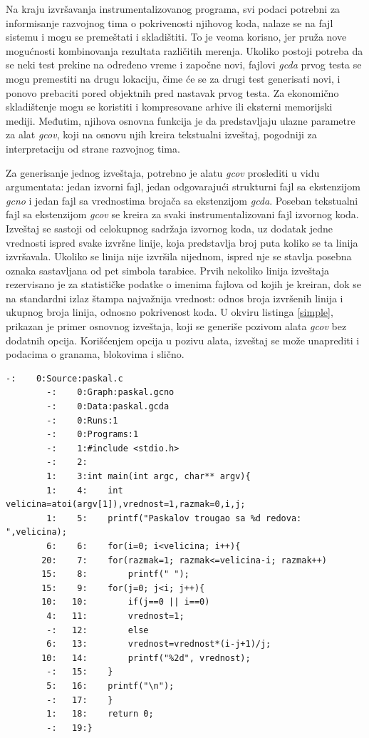 \documentclass[12pt,oneside]{memoir}
\newcommand{\strano}[1]{\textit{#1}}
\begin{document}
Na kraju izvršavanja instrumentalizovanog programa, svi podaci potrebni za informisanje razvojnog tima o pokrivenosti njihovog koda, nalaze se na fajl sistemu i mogu se premeštati i skladištiti. To je veoma korisno, jer pruža nove mogućnosti kombinovanja rezultata različitih merenja. Ukoliko postoji potreba da se neki test prekine na određeno vreme i započne novi, fajlovi \strano{gcda} prvog testa se mogu premestiti na drugu lokaciju, čime će se za drugi test generisati novi, i ponovo prebaciti pored objektnih pred nastavak prvog testa. Za ekonomično skladištenje mogu se koristiti i kompresovane arhive ili eksterni memorijski mediji. Međutim, njihova osnovna funkcija je da predstavljaju ulazne parametre za alat \strano{gcov}, koji na osnovu njih kreira tekstualni izveštaj, pogodniji za interpretaciju od strane razvojnog tima.

Za generisanje jednog izveštaja, potrebno je alatu \strano{gcov} proslediti u vidu argumentata: jedan izvorni fajl, jedan odgovarajući strukturni fajl sa ekstenzijom \strano{gcno} i jedan fajl sa vrednostima brojača sa ekstenzijom \strano{gcda}. Poseban tekstualni fajl sa ekstenzijom \strano{gcov} se kreira za svaki instrumentalizovani fajl izvornog koda. Izveštaj se sastoji od celokupnog sadržaja izvornog koda, uz dodatak jedne vrednosti ispred svake izvršne linije, koja predstavlja broj puta koliko se ta linija izvršavala. Ukoliko se linija nije izvršila nijednom, ispred nje se stavlja posebna oznaka sastavljana od pet simbola tarabice. Prvih nekoliko linija izveštaja rezervisano je za statističke podatke o imenima fajlova od kojih je kreiran, dok se na standardni izlaz štampa najvažnija vrednost: odnos broja izvršenih linija i ukupnog broja linija, odnosno pokrivenost koda. U okviru listinga \ref{simple}, prikazan je primer osnovnog izveštaja, koji se generiše pozivom alata \strano{gcov} bez dodatnih opcija. Korišćenjem opcija u pozivu alata, izveštaj se može unaprediti i podacima o granama, blokovima i slično. 
\\

\begin{lstlisting}[caption={Primer osnovnog izveštaja koji generiše \strano{gcov}},frame=single, label=simple]
        -:    0:Source:paskal.c
        -:    0:Graph:paskal.gcno
        -:    0:Data:paskal.gcda
        -:    0:Runs:1
        -:    0:Programs:1
        -:    1:#include <stdio.h>
        -:    2:
        1:    3:int main(int argc, char** argv){
        1:    4:    int velicina=atoi(argv[1]),vrednost=1,razmak=0,i,j;
        1:    5:    printf("Paskalov trougao sa %d redova: ",velicina);
        6:    6:    for(i=0; i<velicina; i++){
       20:    7:	for(razmak=1; razmak<=velicina-i; razmak++)
       15:    8:	    printf(" ");
       15:    9:	for(j=0; j<i; j++){
       10:   10:	    if(j==0 || i==0)
        4:   11:		vrednost=1;
        -:   12:	    else
        6:   13:		vrednost=vrednost*(i-j+1)/j;
       10:   14:	    printf("%2d", vrednost);
        -:   15:	}
        5:   16:	printf("\n");
        -:   17:    }
        1:   18:    return 0;
        -:   19:}
\end{lstlisting}
\end{document}
